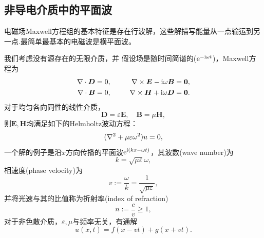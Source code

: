 \subsection{非导电介质中的平面波}
电磁场Maxwell方程组的基本特征是存在行波解，这些解描写能量从一点输运到另一点.最简单最基本的电磁波是横平面波。%

我们考虑没有源存在的无限介质，并
假设场是随时间简谐的($\mathop{}\!\mathrm{e}^{-\mathrm{i}\omega t}$)，Maxwell方程为
\begin{alignat*}{2}
    \nabla\cdot\bm D&=0,&\qquad\nabla\times\bm E-\mathrm{i}\omega\bm B&=\bm 0,\\
    \nabla\cdot\bm B&=0,&\nabla\times\bm H+\mathrm{i}\omega\bm D&=\bm 0.    
\end{alignat*}
对于均匀各向同性的线性介质，
\[
    \bm D=\varepsilon\bm E,\quad\bm B=\mu\bm H,
\]
则$\bm E,\bm H$均满足如下的Helmholtz波动方程：
\begin{equation}
    (\nabla^2+\mu\varepsilon\omega^2)u=0,
\end{equation}
一个解的例子是沿$x$方向传播的平面波$\mathop{}\!\mathrm{e}^{\mathrm{i}(kx-\omega t)}$，其波数(wave number)为
\[
    k=\sqrt{\mu\varepsilon}\omega,
\]
相速度(phase velocity)为
\begin{equation}
    v:=\frac{\omega}k=\frac1{\sqrt{\mu\varepsilon}},
\end{equation}
并将光速与其的比值称为折射率(index of refraction)
\begin{equation}
    n:=\frac cv\geqslant1,
\end{equation}
对于非色散介质，$\varepsilon,\mu$与频率无关，有通解
\[
    u(x,t)=f(x-vt)+g(x+vt).
\]
